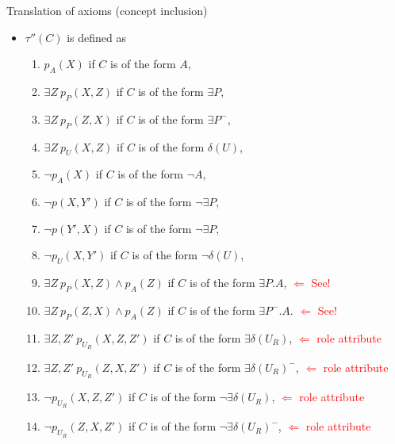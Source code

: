 \documentclass{beamer}
\begin{document}
\begin{frame}{Translation of axioms (concept inclusion)}
\begin{itemize}
 \item $ \tau''(C) $ is defined as
 \begin{enumerate}
 \tiny
 \item $ p_A (X)$ if $C$ is of the form $A$,
  \item $ \exists Z ~ p_P (X,Z)$ if $C$ is of the form $\exists P$,
  \item  $ \exists Z ~ p_P (Z,X)$  if $C$ is of the form $\exists P^-$,
  \item $\exists Z ~   p_U (X,Z)$ if $C$ is of the form $\delta (U)$,
 \item $ \neg p_A (X)$ if $C$ is of the form $\neg A$, 
 \item $ \neg p (X,Y')$ if $C$ is of the form $\neg \exists P$,
\item $ \neg p (Y',X)$ if $C$ is of the form $\neg \exists P$,
 \item $\neg  p_U (X,Y')$ if $C$ is of the form $\neg \delta (U)$,
 \item $\exists Z ~   p_P (X,Z) \wedge p_A(Z)$ if $C$ is of the form $\exists P. A$,  \textcolor{red}{$\Leftarrow$ See!}
   \item $\exists Z ~   p_P (Z,X) \wedge p_A(Z)$ if $C$ is of the form $\exists P^{-}. A$. \textcolor{red}{$\Leftarrow$ See!}
  \item $\exists Z, Z' ~p_{U_R}(X,Z,Z')$ if $C$ is of the form $\exists \delta (U_R)$,  \textcolor{red}{$\Leftarrow$ role attribute}
   \item $\exists Z, Z' ~p_{U_R}(Z,X,Z')$ if $C$ is of the form $\exists \delta (U_R)^-$,  \textcolor{red}{$\Leftarrow$ role attribute}
    \item $\neg p_{U_R}(X,Z,Z')$ if $C$ is of the form $\neg \exists \delta (U_R)$,  \textcolor{red}{$\Leftarrow$ role attribute}
      \item $\neg p_{U_R}(Z,X,Z')$ if $C$ is of the form $\neg \exists \delta (U_R)^-$,  \textcolor{red}{$\Leftarrow$ role attribute}
 \end{enumerate}
 
  \end{itemize}

 \end{frame}
 
\end{document}
